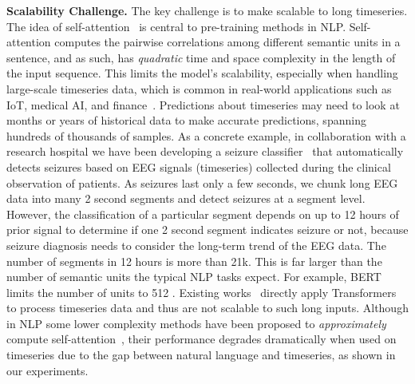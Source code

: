 \noindent\textbf{Scalability Challenge.} The key challenge is to make \system scalable to long timeseries.
The idea of self-attention~\cite{DBLP:conf/nips/VaswaniSPUJGKP17} is central to pre-training methods in NLP. Self-attention computes the pairwise correlations among different semantic units in a sentence, and as such, has {\it quadratic} time and space complexity in the length of the input sequence. 
This limits the model's scalability, especially when handling large-scale timeseries data, which is common in real-world applications such as IoT, medical AI, and finance~\cite{zhou2021informer,DBLP:journals/pvldb/CaoTAJYLGSBSCWM19,liu2018open}. Predictions about timeseries may need to look at months or years of historical data to make accurate predictions, spanning hundreds of thousands of samples.  
As a concrete example, in collaboration with a research hospital we have been developing a seizure classifier~\cite{DBLP:journals/pvldb/CaoTAJYLGSBSCWM19} that automatically detects seizures based on EEG signals (timeseries) collected during the clinical observation of patients. As seizures last only a few seconds, we chunk long EEG data into many 2 second segments and detect seizures at a segment level. However, the classification of a particular segment depends on up to 12 hours of prior signal to determine if one 2 second segment indicates seizure or not, because seizure diagnosis needs to consider the long-term trend of the EEG data. The number of segments in 12 hours is more than 21k. 
This is far larger than the number of semantic units the typical NLP tasks expect. For example, BERT~\cite{DBLP:conf/naacl/DevlinCLT19} limits the number of units to 512 .
Existing works~\cite{DBLP:conf/kdd/ZerveasJPBE21} directly apply Transformers to process timeseries data and thus are not scalable to such long inputs. 
Although in NLP some lower complexity methods have been proposed to {\it approximately} compute self-attention~\cite{kitaev2020reformer,choromanski2020rethinking,wang2020linformer}, their performance degrades dramatically when used on timeseries due to the gap between natural language and timeseries, as shown in our experiments. 

